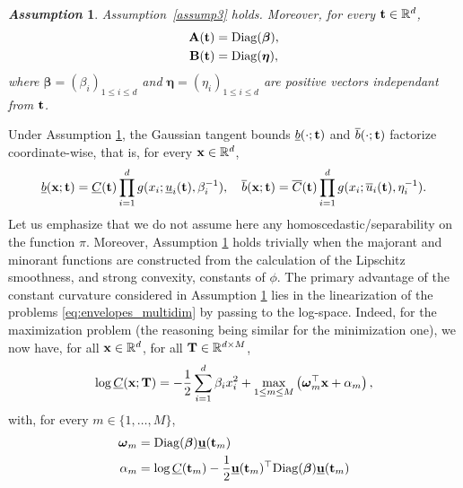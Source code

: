 \documentclass[review]{elsarticle}
\newtheorem{assumption}{\em Assumption}
\def\x{{\bf x}}
\def\u{{\bf u}}
\def\t{{\bf t}}
\def\A{{\bf A}}
\def\B{{\bf B}}
\def\T{{\bf T}}
\begin{document}
{\begin{assumption}
\label{ass:homosce}
Assumption~\ref{assump3} holds. Moreover, for every $\t \in \mathbb{R}^d$, 
\begin{align}
\label{eq:diag_BN_const}
\A(\t) &= \mathrm{Diag}(\boldsymbol{\beta}),\\%
\B(\t) & = \mathrm{Diag}(\boldsymbol{\eta}),%
\end{align}
where $\boldsymbol{\beta} = (\beta_{i})_{1 \leq i \leq d}$ and $\boldsymbol{\eta} = (\eta_{i})_{1 \leq i \leq d}$ are positive vectors independant from $\t$. 
\end{assumption}
Under Assumption \ref{ass:homosce}, the Gaussian tangent bounds $\underline{b}(\cdot;\t)$ and $\overline{b}(\cdot;\t)$ factorize coordinate-wise, that is, for every $\x \in \mathbb{R}^d$,
\begin{equation}
\label{eq:bd_factorized_const}
\underline{b}(\x;\t) = \underline{C}(\t) \prod_{i=1}^d g(x_i; \underline{u}_{i}(\t), \beta_{i}^{-1}), \quad 
\overline{b}(\x;\t) = \overline{C}(\t) \prod_{i=1}^d g(x_i; \overline{u}_{i}(\t), \eta_{i}^{-1}).
\end{equation}
Let us emphasize that we do not assume here any homoscedastic/separability on the function $\pi$. Moreover, Assumption \ref{ass:homosce} holds trivially when the majorant and minorant functions are constructed from the calculation of the Lipschitz smoothness, and strong convexity, constants of $\phi$. The primary advantage of the constant curvature considered in Assumption \ref{ass:homosce} lies in the linearization of the problems \eqref{eq:envelopes_multidim} by passing to the log-space. Indeed, for the maximization problem (the reasoning being similar for the minimization one), we now have, for all $\x \in \mathbb{R}^d$, for all $\T \in \mathbb{R}^{d \times M}$,
\begin{equation}
\log \underline{C}(\x;\T) = -\frac{1}{2} \sum_{i=1}^d \beta_{i} x_i^2 + \max_{1 \le m \le M} \left(\boldsymbol{\omega}_m^\top \x + \alpha_m \right),
\label{eq:logmax}
\end{equation}
with, for every $m \in \{1,\ldots,M\}$, 
\begin{align}
\label{eq:affine}
\boldsymbol{\omega}_m & = \mathrm{Diag}(\boldsymbol{\beta}) \underline{\u}(\t_m)\\
\alpha_m & = \log \underline{C}(\t_m) - \frac{1}{2} \underline{\u}(\t_m)^\top \mathrm{Diag}(\boldsymbol{\beta}) \underline{\u}(\t_m) \nonumber\\

\end{align}}
\end{document}
